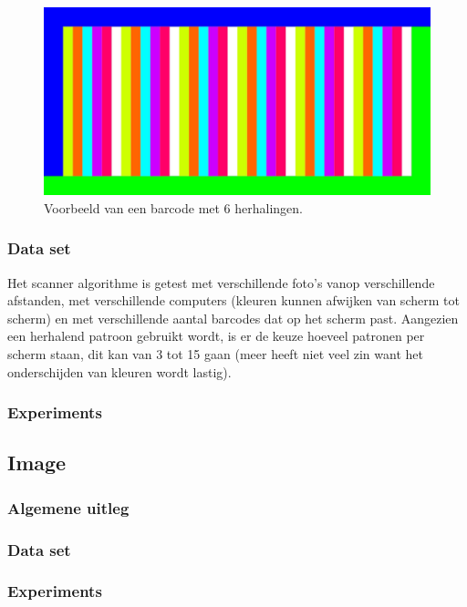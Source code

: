 \documentclass[a4paper,11pt]{article}
\begin{document}
\begin{figure}
\centering
\includegraphics[scale=0.1]{barcode}
\caption{Voorbeeld van een barcode met 6 herhalingen.} 
\label{fig:barcode}
\end{figure}



\subsubsection{Data set}

Het scanner algorithme is getest met verschillende foto's vanop verschillende afstanden, met verschillende computers (kleuren kunnen afwijken van scherm tot scherm) en met verschillende aantal barcodes dat op het scherm past. Aangezien een herhalend patroon gebruikt wordt, is er de keuze hoeveel patronen per scherm staan, dit kan van 3 tot 15 gaan (meer heeft niet veel zin want het onderschijden van kleuren wordt lastig).

\subsubsection{Experiments}\label{sec:experimenten}

\subsection{Image}
\subsubsection{Algemene uitleg}
\subsubsection{Data set}
\subsubsection{Experiments}
\end{document}
